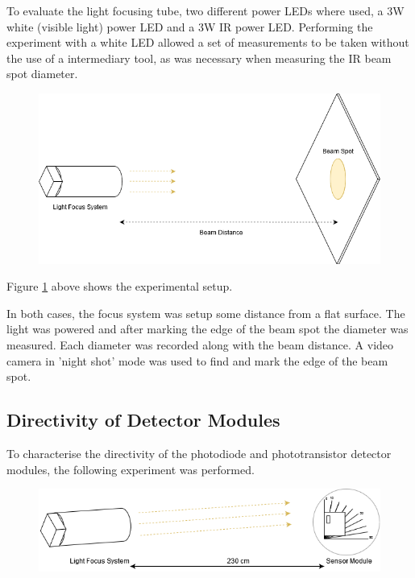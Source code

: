 To evaluate the light focusing tube, two different power LEDs where used, a 3W white (visible light) power LED and a 3W IR power LED. Performing the experiment with a white LED allowed a set of measurements to be taken without the use of a intermediary tool, as was necessary when measuring the IR beam spot diameter.

\begin{figure}[H]
	\centering
	\includegraphics[width=.7\linewidth]{figures/experimentation/beam_spot_experiement.png}
	\label{fig:focus_system_experiemnt}
\end{figure}

Figure \ref{fig:focus_system_experiemnt} above shows the experimental setup.

In both cases, the focus system was setup some distance from a flat surface. The light was powered and after marking the edge of the beam spot the diameter was measured. Each diameter was recorded along with the beam distance. A video camera in 'night shot' mode was used to find and mark the edge of the beam spot.





\subsection{Directivity of Detector Modules}

To characterise the directivity of the photodiode and phototransistor detector modules, the following experiment was performed.

\begin{figure}[H]
	\centering
	\includegraphics[width=.9\linewidth]{figures/experimentation/beam_angle_of_receiver.png}
	\label{fig:directivity_experiement_setup}
\end{figure}

